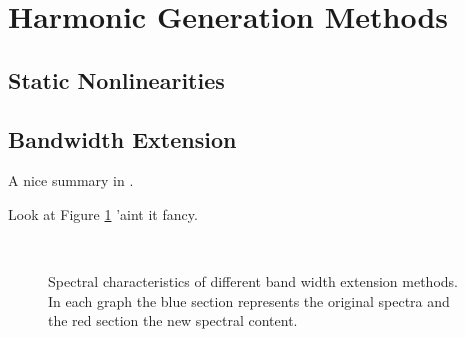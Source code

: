 \section{Harmonic Generation Methods}
\label{sec:Excitation-Methods}

	\subsection{Static Nonlinearities}
	\label{sec:Excitation-Statics}

	\subsection{Bandwidth Extension}
	\label{sec:Excitation-BWE}
		\note
		{
			A nice summary in \citet{larsen2004audio}.

			Look at Figure \ref{fig:SpectralFolding} 'aint it fancy.
		}

		\begin{figure}[h!]
			\centering
			\\
			\caption{Spectral characteristics of different band width extension methods. In each graph the blue 
			section represents the original spectra and the red section the new spectral content.}
			\label{fig:SpectralFolding}
		\end{figure}

